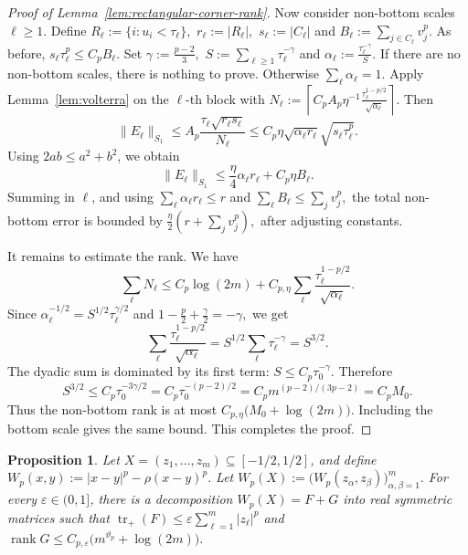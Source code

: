 \documentclass[11pt]{article}
\newtheorem{prop}[theorem]{Proposition}
\theoremstyle{definition}
\begin{document}
\begin{proof}[Proof of Lemma~\ref{lem:rectangular-corner-rank}]
Now consider non-bottom scales \(\ell\ge1\). Define
\(
R_\ell:=\{i:u_i<\tau_\ell\},\)
\(
r_\ell:=|R_\ell|,\)
\(
s_\ell:=|C_\ell|\)
and
\(
B_\ell:=\sum_{j\in C_\ell}v_j^p.
\)
As before,
\(
s_\ell\tau_\ell^p\le C_pB_\ell.
\)
Set
\(
\gamma:=\frac{p-2}{3},\)
\(
S:=\sum_{\ell\ge1}\tau_\ell^{-\gamma}\)
and
\(
\alpha_\ell:=\frac{\tau_\ell^{-\gamma}}{S}.
\)
If there are no non-bottom scales, there is nothing to prove. Otherwise
\(\sum_\ell\alpha_\ell=1\). Apply Lemma~\ref{lem:volterra} on the \(\ell\)-th
block with
\(
N_\ell:=
\left\lceil
C_pA_p\eta^{-1}
\frac{\tau_\ell^{1-p/2}}{\sqrt{\alpha_\ell}}
\right\rceil.
\)
Then
\[
\|E_\ell\|_{S_1}
\le
A_p\frac{\tau_\ell\sqrt{r_\ell s_\ell}}{N_\ell}
\le
C_p\eta\sqrt{\alpha_\ell r_\ell}\sqrt{s_\ell\tau_\ell^p}.
\]
Using \(2ab\le a^2+b^2\), we obtain
\[
\|E_\ell\|_{S_1}
\le
\frac{\eta}{4}\alpha_\ell r_\ell
+
C_p\eta B_\ell.
\]
Summing in \(\ell\), and using
\(
\sum_\ell \alpha_\ell r_\ell\le r\) and
\(
\sum_\ell B_\ell\le\sum_jv_j^p,
\)
the total non-bottom error is bounded by
\(
\frac{\eta}{2}\left(r+\sum_jv_j^p\right),
\)
after adjusting constants.

It remains to estimate the rank. We have
\[
\sum_\ell N_\ell
\le
C_p\log(2m)
+
C_{p,\eta}
\sum_\ell
\frac{\tau_\ell^{1-p/2}}{\sqrt{\alpha_\ell}}.
\]
Since
\(
\alpha_\ell^{-1/2}=S^{1/2}\tau_\ell^{\gamma/2}
\)
and
\(
1-\frac p2+\frac{\gamma}{2}=-\gamma,
\)
we get
\[
\sum_\ell
\frac{\tau_\ell^{1-p/2}}{\sqrt{\alpha_\ell}}
=
S^{1/2}\sum_\ell\tau_\ell^{-\gamma}
=
S^{3/2}.
\]
The dyadic sum is dominated by its first term:
\(
S\le C_p\tau_0^{-\gamma}.
\)
Therefore
\[
S^{3/2}
\le
C_p\tau_0^{-3\gamma/2}
=
C_p\tau_0^{-(p-2)/2}
=
C_pm^{(p-2)/(3p-2)}
=
C_pM_0.
\]
Thus the non-bottom rank is at most
\(
C_{p,\eta}\bigl(M_0+\log(2m)\bigr).
\)
Including the bottom scale gives the same bound. This completes the proof.
\end{proof}

\begin{prop}\label{prop:strong-torus-corner}
Let \(X=(z_1,\dots,z_m)\subseteq [-1/2,1/2]\), and define
\(
W_p(x,y):=|x-y|^p-\rho(x-y)^p.
\)
Let
\(
W_p(X):=\bigl(W_p(z_\alpha,z_\beta)\bigr)_{\alpha,\beta=1}^m.
\)
For every \(\varepsilon\in(0,1]\), there is a decomposition
\(
W_p(X)=F+G
\)
into real symmetric matrices such that
\(
\operatorname{tr}_+(F)
\le
\varepsilon\sum_{\ell=1}^m |z_\ell|^p
\)
and
\(
\operatorname{rank}G
\le
C_{p,\varepsilon}\bigl(m^{\vartheta_p}+\log(2m)\bigr).
\)
\end{prop}
\end{document}
